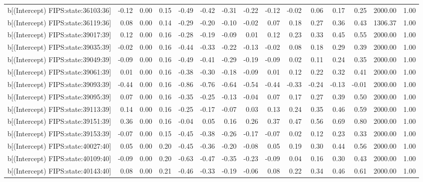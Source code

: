 \begin{table}[ht]
\begin{tabular}{rrrrrrrrrrrrrrr}
  b[(Intercept) FIPS:state:36103:36] & -0.12 & 0.00 & 0.15 & -0.49 & -0.42 & -0.31 & -0.22 & -0.12 & -0.02 & 0.06 & 0.17 & 0.25 & 2000.00 & 1.00 \\ 
  b[(Intercept) FIPS:state:36119:36] & 0.08 & 0.00 & 0.14 & -0.29 & -0.20 & -0.10 & -0.02 & 0.07 & 0.18 & 0.27 & 0.36 & 0.43 & 1306.37 & 1.00 \\ 
  b[(Intercept) FIPS:state:39017:39] & 0.12 & 0.00 & 0.16 & -0.28 & -0.19 & -0.09 & 0.01 & 0.12 & 0.23 & 0.33 & 0.45 & 0.55 & 2000.00 & 1.00 \\ 
  b[(Intercept) FIPS:state:39035:39] & -0.02 & 0.00 & 0.16 & -0.44 & -0.33 & -0.22 & -0.13 & -0.02 & 0.08 & 0.18 & 0.29 & 0.39 & 2000.00 & 1.00 \\ 
  b[(Intercept) FIPS:state:39049:39] & -0.09 & 0.00 & 0.16 & -0.49 & -0.41 & -0.29 & -0.19 & -0.09 & 0.02 & 0.11 & 0.24 & 0.35 & 2000.00 & 1.00 \\ 
  b[(Intercept) FIPS:state:39061:39] & 0.01 & 0.00 & 0.16 & -0.38 & -0.30 & -0.18 & -0.09 & 0.01 & 0.12 & 0.22 & 0.32 & 0.41 & 2000.00 & 1.00 \\ 
  b[(Intercept) FIPS:state:39093:39] & -0.44 & 0.00 & 0.16 & -0.86 & -0.76 & -0.64 & -0.54 & -0.44 & -0.33 & -0.24 & -0.13 & -0.01 & 2000.00 & 1.00 \\ 
  b[(Intercept) FIPS:state:39095:39] & 0.07 & 0.00 & 0.16 & -0.35 & -0.25 & -0.13 & -0.04 & 0.07 & 0.17 & 0.27 & 0.39 & 0.50 & 2000.00 & 1.00 \\ 
  b[(Intercept) FIPS:state:39113:39] & 0.14 & 0.00 & 0.16 & -0.25 & -0.17 & -0.07 & 0.03 & 0.13 & 0.24 & 0.35 & 0.46 & 0.59 & 2000.00 & 1.00 \\ 
  b[(Intercept) FIPS:state:39151:39] & 0.36 & 0.00 & 0.16 & -0.04 & 0.05 & 0.16 & 0.26 & 0.37 & 0.47 & 0.56 & 0.69 & 0.80 & 2000.00 & 1.00 \\ 
  b[(Intercept) FIPS:state:39153:39] & -0.07 & 0.00 & 0.15 & -0.45 & -0.38 & -0.26 & -0.17 & -0.07 & 0.02 & 0.12 & 0.23 & 0.33 & 2000.00 & 1.00 \\ 
  b[(Intercept) FIPS:state:40027:40] & 0.05 & 0.00 & 0.20 & -0.45 & -0.36 & -0.20 & -0.08 & 0.05 & 0.19 & 0.30 & 0.44 & 0.56 & 2000.00 & 1.00 \\ 
  b[(Intercept) FIPS:state:40109:40] & -0.09 & 0.00 & 0.20 & -0.63 & -0.47 & -0.35 & -0.23 & -0.09 & 0.04 & 0.16 & 0.30 & 0.43 & 2000.00 & 1.00 \\ 
  b[(Intercept) FIPS:state:40143:40] & 0.08 & 0.00 & 0.21 & -0.46 & -0.33 & -0.19 & -0.06 & 0.08 & 0.22 & 0.34 & 0.46 & 0.61 & 2000.00 & 1.00 \\ 

\end{tabular}
\end{table}
